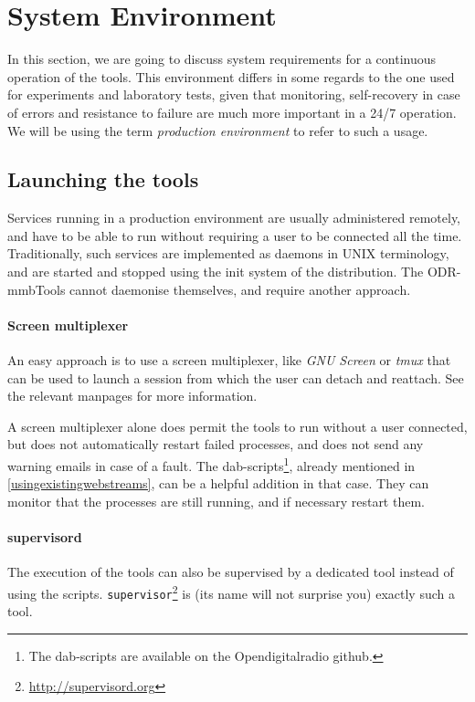 \section{System Environment}

In this section, we are going to discuss system requirements for a continuous
operation of the tools. This environment differs in some regards to the one used
for experiments and laboratory tests, given that monitoring, self-recovery in
case of errors and resistance to failure are much more important in a 24/7
operation. We will be using the term \emph{production environment} to refer to
such a usage.

\subsection{Launching the tools}

Services running in a production environment are usually administered remotely,
and have to be able to run without requiring a user to be connected all the
time. Traditionally, such services are implemented as daemons in UNIX
terminology, and are started and stopped using the init system of the
distribution.
The ODR-mmbTools cannot daemonise themselves, and require another approach.

\paragraph{Screen multiplexer}
An easy approach is to use a screen multiplexer, like \emph{GNU Screen} or
\emph{tmux} that can be used to launch a session from which the user can detach
and reattach. See the relevant manpages for more information.

A screen multiplexer alone does permit the tools to run without a user
connected, but does not automatically restart failed processes, and does not
send any warning emails in case of a fault. The
dab-scripts\footnote{The dab-scripts are available on the Opendigitalradio
github.}, already mentioned in \ref{usingexistingwebstreams}, can be a helpful
addition in that case. They can monitor that the processes are still running,
and if necessary restart them.

\paragraph{supervisord}
The execution of the tools can also be supervised by a dedicated tool instead of
using the scripts. \texttt{supervisor}\footnote{\url{http://supervisord.org}} is
(its name will not surprise you) exactly such a tool.

